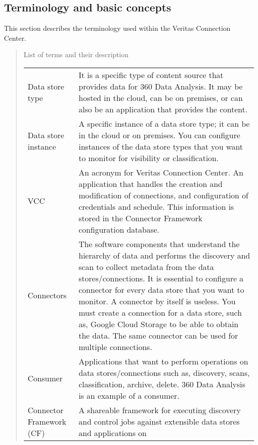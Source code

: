 \documentclass[letterpaper,10pt,english]{sphinxmanual}
\begin{document}
\subsection{Terminology and basic concepts}
\label{\detokenize{mcdmp_app_ug:terminology-and-basic-concepts}}
This section describes the terminology used within the Veritas Connection Center.
\begin{quote}

 List of terms and their description


\begin{savenotes}\sphinxattablestart
\centering
\begin{tabulary}{\linewidth}[t]{|T|T|}
\hline
{}\relax &\relax \\
\hline
Data store type
&
It is a specific type of content source that provides data
for 360 Data Analysis. It may be hosted in the cloud, can
be on premises, or can also be an application that provides
the content.
\\
\hline
Data store instance
&
A specific instance of a data store type; it can be
in the cloud or on premises.
You can configure instances of the data store types
that you want to monitor for visibility or classification.
\\
\hline
VCC
&
An acronym for Veritas Connection Center.
An application that handles the creation and modification
of connections, and configuration of credentials
and schedule. This information is stored in the Connector
Framework configuration database.
\\
\hline
Connectors
&
The software components that understand the hierarchy of
data and performs the discovery and scan to collect
metadata from the data stores/connections. It is essential
to configure a connector for every data store that you
want to monitor.
A connector by itself is useless. You must create a
connection for a data store, such as, Google Cloud Storage
to be able to obtain the data. The same connector can be
used for multiple  connections.
\\
\hline
Consumer
&
Applications that want to perform operations on data
stores/connections such as, discovery, scans,
classification, archive, delete.
360 Data Analysis is an example of a consumer.
\\
\hline
Connector Framework (CF)
&
A shareable framework for executing discovery and control
jobs against extensible data stores and applications on

\end{tabulary}
\end{savenotes}
\end{quote}
\end{document}
